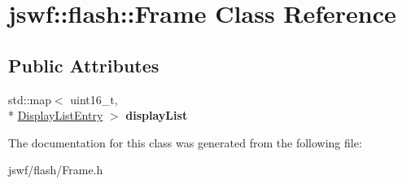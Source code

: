 \hypertarget{classjswf_1_1flash_1_1_frame}{\section{jswf\+:\+:flash\+:\+:Frame Class Reference}
\label{classjswf_1_1flash_1_1_frame}
}
\subsection*{Public Attributes}
\begin{DoxyCompactItemize}
\item 
\hypertarget{classjswf_1_1flash_1_1_frame_aa11950e62e1012d05a729c9035b7ca15}{std\+::map$<$ uint16\+\_\+t, \\*
\hyperlink{structjswf_1_1flash_1_1_display_list_entry}{Display\+List\+Entry} $>$ {\bfseries display\+List}}\label{classjswf_1_1flash_1_1_frame_aa11950e62e1012d05a729c9035b7ca15}

\end{DoxyCompactItemize}


The documentation for this class was generated from the following file\+:\begin{DoxyCompactItemize}
\item 
jswf/flash/Frame.\+h\end{DoxyCompactItemize}
